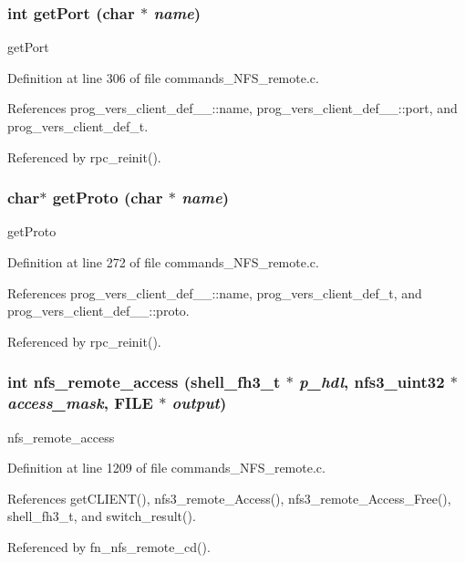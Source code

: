 \subsubsection{\setlength{\rightskip}{0pt plus 5cm}int get\-Port (char $\ast$ {\em name})}\label{commands__NFS__remote_8c_a27}


get\-Port 

Definition at line 306 of file commands\_\-NFS\_\-remote.c.

References prog\_\-vers\_\-client\_\-def\_\-\_\-::name, prog\_\-vers\_\-client\_\-def\_\-\_\-::port, and prog\_\-vers\_\-client\_\-def\_\-t.

Referenced by rpc\_\-reinit().
\subsubsection{\setlength{\rightskip}{0pt plus 5cm}char$\ast$ get\-Proto (char $\ast$ {\em name})}\label{commands__NFS__remote_8c_a25}


get\-Proto 

Definition at line 272 of file commands\_\-NFS\_\-remote.c.

References prog\_\-vers\_\-client\_\-def\_\-\_\-::name, prog\_\-vers\_\-client\_\-def\_\-t, and prog\_\-vers\_\-client\_\-def\_\-\_\-::proto.

Referenced by rpc\_\-reinit().
\subsubsection{\setlength{\rightskip}{0pt plus 5cm}int nfs\_\-remote\_\-access ({\bf shell\_\-fh3\_\-t} $\ast$ {\em p\_\-hdl}, nfs3\_\-uint32 $\ast$ {\em access\_\-mask}, FILE $\ast$ {\em output})}\label{commands__NFS__remote_8c_a42}


nfs\_\-remote\_\-access 

Definition at line 1209 of file commands\_\-NFS\_\-remote.c.

References get\-CLIENT(), nfs3\_\-remote\_\-Access(), nfs3\_\-remote\_\-Access\_\-Free(), shell\_\-fh3\_\-t, and switch\_\-result().

Referenced by fn\_\-nfs\_\-remote\_\-cd().

